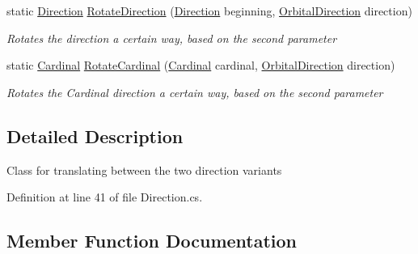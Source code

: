 \begin{DoxyCompactItemize}
static \hyperlink{namespaceHumDrum_1_1Structures_a83ca1f04475980cb7e79d471cc746dd3}{Direction} \hyperlink{classHumDrum_1_1Structures_1_1DirectionOperations_a52ec773a9bf9ae47392afffaf1e993ba}{Rotate\+Direction} (\hyperlink{namespaceHumDrum_1_1Structures_a83ca1f04475980cb7e79d471cc746dd3}{Direction} beginning, \hyperlink{namespaceHumDrum_1_1Structures_a1b5e67f976aea8954390bccad43a9c9e}{Orbital\+Direction} direction)
\begin{DoxyCompactList}\small\item\em Rotates the direction a certain way, based on the second parameter \end{DoxyCompactList}\item 
static \hyperlink{namespaceHumDrum_1_1Structures_ac777de8ca588ec37dd8793047a84192a}{Cardinal} \hyperlink{classHumDrum_1_1Structures_1_1DirectionOperations_af9d00d5c3f5b3304ae181c61a47f11d5}{Rotate\+Cardinal} (\hyperlink{namespaceHumDrum_1_1Structures_ac777de8ca588ec37dd8793047a84192a}{Cardinal} cardinal, \hyperlink{namespaceHumDrum_1_1Structures_a1b5e67f976aea8954390bccad43a9c9e}{Orbital\+Direction} direction)
\begin{DoxyCompactList}\small\item\em Rotates the Cardinal direction a certain way, based on the second parameter \end{DoxyCompactList}\end{DoxyCompactItemize}


\subsection{Detailed Description}
Class for translating between the two direction variants 



Definition at line 41 of file Direction.\+cs.



\subsection{Member Function Documentation}
